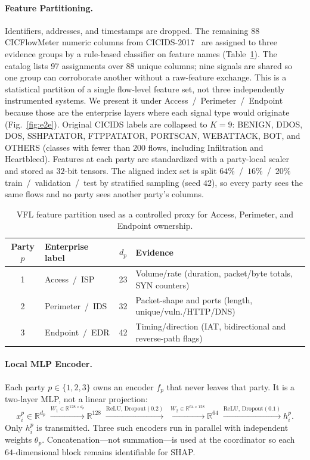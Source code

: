 \paragraph{Feature Partitioning.}
Identifiers, addresses, and timestamps are dropped. The remaining 88 CICFlowMeter numeric columns from CICIDS-2017~\cite{sharafaldin2018} are assigned to three evidence groups by a rule-based classifier on feature names (Table~\ref{tab:detect-parties}). The catalog lists 97 assignments over 88 unique columns; nine signals are shared so one group can corroborate another without a raw-feature exchange. This is a statistical partition of a single flow-level feature set, not three independently instrumented systems. We present it under Access~/~Perimeter~/~Endpoint because those are the enterprise layers where each signal type would originate (Fig.~\ref{fig:e2e}). Original CICIDS labels are collapsed to $K=9$: BENIGN, DDOS, DOS, SSHPATATOR, FTPPATATOR, PORTSCAN, WEBATTACK, BOT, and OTHERS (classes with fewer than $200$ flows, including Infiltration and Heartbleed). Features at each party are standardized with a party-local scaler and stored as $32$-bit tensors. The aligned index set is split $64\%$~/~$16\%$~/~$20\%$ train~/~validation~/~test by stratified sampling (seed $42$), so every party sees the same flows and no party sees another party's columns.

\begin{table}[t]
\caption{VFL feature partition used as a controlled proxy for Access, Perimeter, and Endpoint ownership.}
\label{tab:detect-parties}
\centering
\begin{tabular}{clcl}
\hline
Party $p$ & Enterprise label & $d_p$ & Evidence \\
\hline
1 & Access~/~ISP & 23 & Volume/rate (duration, packet/byte totals, SYN counters) \\
2 & Perimeter~/~IDS & 32 & Packet-shape and ports (length, unique/vuln./HTTP/DNS) \\
3 & Endpoint~/~EDR & 42 & Timing/direction (IAT, bidirectional and reverse-path flags) \\
\hline
\end{tabular}
\end{table}

\paragraph{Local MLP Encoder.}
Each party $p\in\{1,2,3\}$ owns an encoder $f_p$ that never leaves that party. It is a two-layer MLP, not a linear projection:
\begin{equation}
x_i^p \in\mathbb{R}^{d_p}
\;\xrightarrow{W_1\in\mathbb{R}^{128\times d_p}}
\mathbb{R}^{128}
\;\xrightarrow{\mathrm{ReLU},\,\mathrm{Dropout}(0.2)}
\;\xrightarrow{W_2\in\mathbb{R}^{64\times 128}}
\mathbb{R}^{64}
\;\xrightarrow{\mathrm{ReLU},\,\mathrm{Dropout}(0.1)}
h_i^p.
\end{equation}
Only $h_i^p$ is transmitted. Three such encoders run in parallel with independent weights $\theta_p$. Concatenation---not summation---is used at the coordinator so each $64$-dimensional block remains identifiable for SHAP.

